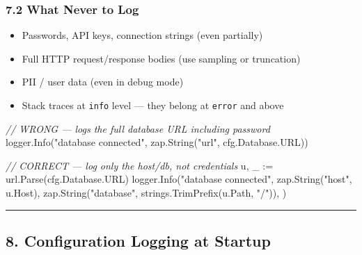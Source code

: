 \documentclass[
]{article}
\newenvironment{Shaded}{}{}
\newcommand{\CommentTok}[1]{\textcolor[rgb]{0.38,0.63,0.69}{\textit{#1}}}
\newcommand{\NormalTok}[1]{#1}
\newcommand{\OperatorTok}[1]{\textcolor[rgb]{0.40,0.40,0.40}{#1}}
\newcommand{\StringTok}[1]{\textcolor[rgb]{0.25,0.44,0.63}{#1}}
\providecommand{\tightlist}{%
  \setlength{\itemsep}{0pt}\setlength{\parskip}{0pt}}
\begin{document}
\hypertarget{what-never-to-log}{%
\subsubsection{7.2 What Never to Log}\label{what-never-to-log}}

\begin{itemize}
\tightlist
\item
  Passwords, API keys, connection strings (even partially)
\item
  Full HTTP request/response bodies (use sampling or truncation)
\item
  PII / user data (even in debug mode)
\item
  Stack traces at \texttt{info} level --- they belong at \texttt{error}
  and above
\end{itemize}

\begin{Shaded}
\begin{Highlighting}[]
\CommentTok{// WRONG — logs the full database URL including password}
\NormalTok{logger}\OperatorTok{.}\NormalTok{Info}\OperatorTok{(}\StringTok{"database connected"}\OperatorTok{,}\NormalTok{ zap}\OperatorTok{.}\NormalTok{String}\OperatorTok{(}\StringTok{"url"}\OperatorTok{,}\NormalTok{ cfg}\OperatorTok{.}\NormalTok{Database}\OperatorTok{.}\NormalTok{URL}\OperatorTok{))}

\CommentTok{// CORRECT — log only the host/db, not credentials}
\NormalTok{u}\OperatorTok{,}\NormalTok{ \_ }\OperatorTok{:=}\NormalTok{ url}\OperatorTok{.}\NormalTok{Parse}\OperatorTok{(}\NormalTok{cfg}\OperatorTok{.}\NormalTok{Database}\OperatorTok{.}\NormalTok{URL}\OperatorTok{)}
\NormalTok{logger}\OperatorTok{.}\NormalTok{Info}\OperatorTok{(}\StringTok{"database connected"}\OperatorTok{,}
\NormalTok{    zap}\OperatorTok{.}\NormalTok{String}\OperatorTok{(}\StringTok{"host"}\OperatorTok{,}\NormalTok{ u}\OperatorTok{.}\NormalTok{Host}\OperatorTok{),}
\NormalTok{    zap}\OperatorTok{.}\NormalTok{String}\OperatorTok{(}\StringTok{"database"}\OperatorTok{,}\NormalTok{ strings}\OperatorTok{.}\NormalTok{TrimPrefix}\OperatorTok{(}\NormalTok{u}\OperatorTok{.}\NormalTok{Path}\OperatorTok{,} \StringTok{"/"}\OperatorTok{)),}
\OperatorTok{)}
\end{Highlighting}
\end{Shaded}

\begin{center}\rule{0.5\linewidth}{0.5pt}\end{center}

\hypertarget{configuration-logging-at-startup}{%
\subsection{8. Configuration Logging at
Startup}\label{configuration-logging-at-startup}}
\end{document}
